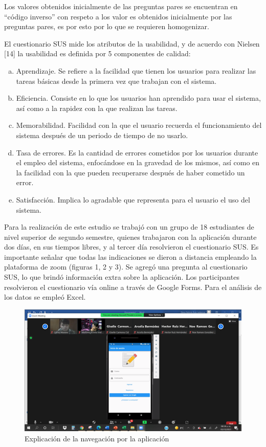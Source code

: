 \documentclass{article}
\begin{document}
Los valores obtenidos inicialmente de las preguntas pares se encuentran en “código inverso” 
con respeto a los valor	es obtenidos inicialmente por las preguntas pares, es por esto por 
lo que se requieren homogenizar. 

El cuestionario SUS mide los atributos de la usabilidad, y de acuerdo con Nielsen [14]%
la usabilidad es definida por 5 componentes de calidad: 

\begin{enumerate}[a)] %
\item Aprendizaje. Se refiere a la facilidad que tienen los usuarios para realizar las 
tareas básicas desde la primera vez que trabajan con el sistema. 
\item Eficiencia. Consiste en lo que los usuarios han aprendido para usar el sistema, 
así como a la rapidez con la que realizan las tareas. 
\item Memorabilidad. Facilidad con la que el usuario recuerda el funcionamiento del 
sistema después de un periodo de tiempo de no usarlo.
\item Tasa de errores. Es la cantidad de errores cometidos por los usuarios durante 
el empleo del sistema, enfocándose en la gravedad de los mismos, así como en la 
facilidad con la que pueden recuperarse después de haber cometido un error.
\item Satisfacción. Implica lo agradable que representa para el usuario el uso del 
sistema.
\end{enumerate}

Para la realización de este estudio se trabajó con un grupo de 18 estudiantes de nivel 
superior de segundo semestre, quienes trabajaron con la aplicación durante dos días, 
en sus tiempos libres, y al tercer día resolvieron el cuestionario SUS. Es importante 
señalar que todas las indicaciones se dieron a distancia empleando la plataforma de 
zoom (figuras 1, 2 y 3). Se agregó una pregunta al cuestionario SUS, lo que brindó 
información extra sobre la aplicación. Los participantes resolvieron el cuestionario 
vía online a través de Google Forms. Para el análisis de los datos se empleó Excel. 


\begin{figure}[H]
    \centering
    \includegraphics[scale=0.7]{imgs/pruebas/pruebas_01.png}
    \caption{Explicación de la navegación por la aplicación}
\end{figure}
\end{document}
